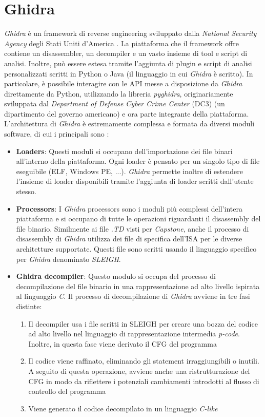 \documentclass[../main.tex]{subfiles}
\begin{document}
\section{Ghidra}
\textit{Ghidra} è un framework di reverse engineering sviluppato dalla \textit{National Security Agency} degli Stati Uniti d'America \cite{eagle2020ghidra}.
La piattaforma che il framework offre contiene un disassembler, un decompiler e un vasto insieme di tool e script di analisi. Inoltre, può essere
estesa tramite l'aggiunta di plugin e script di analisi personalizzati scritti in Python o Java (il linguaggio in cui \textit{Ghidra} è scritto). In particolare, è possibile interagire con le API messe a disposizione da \textit{Ghidra}
direttamente da Python, utilizzando la libreria \textit{pyghidra}, originariamente sviluppata dal \textit{Department of Defense Cyber Crime Center} (DC3) (un dipartimento del governo americano) e ora parte integrante della piattaforma.
L'architettura di \textit{Ghidra} è estremamente complessa e formata da diversi moduli software, di cui i principali sono \cite{eagle2020ghidra}:
\begin{itemize}
    \item \textbf{Loaders}: Questi moduli si occupano dell'importazione dei file binari all'interno della piattaforma. Ogni loader è pensato per un singolo tipo di file eseguibile (ELF, Windows PE, ...). \textit{Ghidra} permette inoltre di estendere
    l'insieme di loader disponibili tramite l'aggiunta di loader scritti dall'utente stesso.
    \item \textbf{Processors}: I \textit{Ghidra} processors sono i moduli più complessi dell'intera piattaforma e si occupano di tutte le operazioni riguardanti il disassembly del file binario. Similmente ai file \textit{.TD} visti per \textit{Capstone}, anche il processo di disassembly di \textit{Ghidra} utilizza
    dei file di specifica dell'ISA per le diverse architetture supportate. Questi file sono scritti usando il linguaggio specifico per \textit{Ghidra} denominato \textit{SLEIGH}.
    \item \textbf{Ghidra decompiler}: Questo modulo si occupa del processo di decompilazione del file binario in una rappresentazione ad alto livello ispirata al linguaggio \textit{C}. Il processo di decompilazione di \textit{Ghidra} avviene in tre fasi distinte:
    \begin{enumerate}
        \item Il decompiler usa i file scritti in SLEIGH per creare una bozza del codice ad alto livello nel linguaggio di rappresentazione intermedia \textit{p-code}. Inoltre, in questa fase viene derivato il CFG del programma
        \item Il codice viene raffinato, eliminando gli statement irraggiungibili o inutili. A seguito di questa operazione, avviene anche una ristrutturazione del CFG in modo da riflettere i potenziali cambiamenti introdotti al flusso di controllo del programma
        \item Viene generato il codice decompilato in un linguaggio \textit{C-like}
    \end{enumerate}
\end{itemize}
\end{document}
